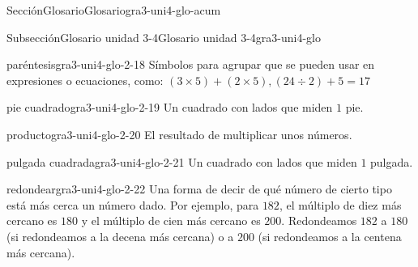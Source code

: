 \documentclass[twoside,14pt,]{extarticle}
\begin{document}
\begin{sectionptx}{Sección}{Glosario}{}{Glosario}{}{}{gra3-uni4-glo-acum}
\begin{subsectionptx}{Subsección}{Glosario unidad 3-4}{}{Glosario unidad 3-4}{}{}{gra3-uni4-glo}
\begin{descriptionlist}
\begin{dlimedium}{paréntesis}{gra3-uni4-glo-2-18}
Símbolos para agrupar que se pueden usar en expresiones o ecuaciones, como: \((3 \times 5) + (2 \times 5), (24 \div 2) + 5 = 17\)%
\end{dlimedium}%
\begin{dlimedium}{pie cuadrado}{gra3-uni4-glo-2-19}%
Un cuadrado con lados que miden \(1\) pie.%
\end{dlimedium}%
\begin{dlimedium}{producto}{gra3-uni4-glo-2-20}%
El resultado de multiplicar unos números.%
\end{dlimedium}%
\begin{dlimedium}{pulgada cuadrada}{gra3-uni4-glo-2-21}%
Un cuadrado con lados que miden \(1\) pulgada.%
\end{dlimedium}%
\begin{dlimedium}{redondear}{gra3-uni4-glo-2-22}%
Una forma de decir de qué número de cierto tipo está más cerca un número dado. Por ejemplo, para \(182\), el múltiplo de diez más cercano es \(180\) y el múltiplo de cien más cercano es \(200\). Redondeamos \(182\) a \(180\) (si redondeamos a la decena más cercana) o a \(200\) (si redondeamos a la centena más cercana).%
\end{dlimedium}%
\end{descriptionlist}
\end{subsectionptx}
\end{sectionptx}
\end{document}
